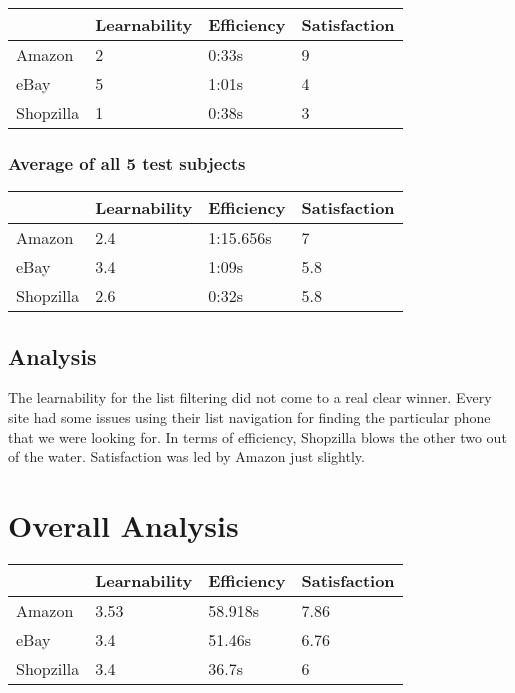 \documentclass[11pt, oneside]{article}
\begin{document}
\begin{center}
\begin{tabular}{| l | l | l | l |}
    \hline
     & Learnability & Efficiency & Satisfaction \\ \hline
    Amazon & 2 & 0:33s & 9 \\ \hline
    eBay & 5 & 1:01s & 4 \\ \hline
    Shopzilla & 1 & 0:38s & 3 \\\hline
\end{tabular}
\end{center}

\subsubsection{Average of all 5 test subjects}

\begin{center}
\begin{tabular}{| l | l | l | l |}
    \hline
     & Learnability & Efficiency & Satisfaction \\ \hline
    Amazon & 2.4 & 1:15.656s & 7 \\ \hline
    eBay & 3.4 & 1:09s & 5.8 \\ \hline
    Shopzilla & 2.6 & 0:32s & 5.8 \\\hline
\end{tabular}
\end{center}

\subsection{Analysis}
The learnability for the list filtering did not come to a real clear winner. Every site had some issues using their list navigation for finding the particular phone that we were looking for. In terms of efficiency, Shopzilla blows the other two out of the water. Satisfaction was led by Amazon just slightly.

\section{Overall Analysis}

\begin{center}
\begin{tabular}{| l | l | l | l |}
    \hline
     & Learnability & Efficiency & Satisfaction \\ \hline
    Amazon & 3.53 & 58.918s & 7.86 \\ \hline
    eBay & 3.4 & 51.46s & 6.76 \\ \hline
    Shopzilla & 3.4 & 36.7s & 6 \\ \hline
\end{tabular}
\end{center}
\vspace{2mm}
\end{document}
